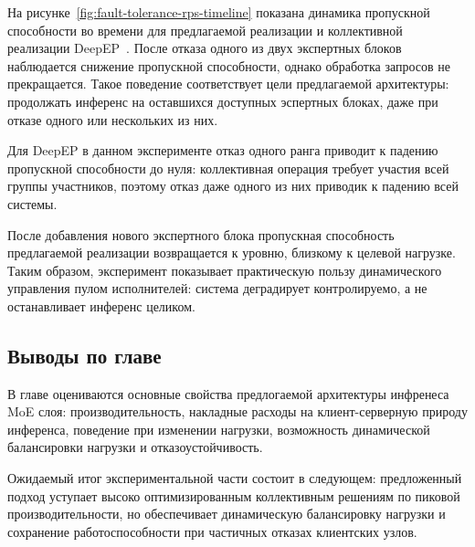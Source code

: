 На рисунке~\ref{fig:fault-tolerance-rps-timeline} показана динамика пропускной способности во времени для предлагаемой реализации и коллективной реализации DeepEP~\cite{deepseekDeepEP}. После отказа одного из двух экспертных блоков наблюдается снижение пропускной способности, однако обработка запросов не прекращается. Такое поведение соответствует цели предлагаемой архитектуры: продолжать инференс на оставшихся доступных эспертных блоках, даже при отказе одного или нескольких из них.

Для DeepEP в данном эксперименте отказ одного ранга приводит к падению пропускной способности до нуля: коллективная операция требует участия всей группы участников, поэтому отказ даже одного из них приводик к падению всей системы.

После добавления нового экспертного блока пропускная способность предлагаемой реализации возвращается к уровню, близкому к целевой нагрузке. Таким образом, эксперимент показывает практическую пользу динамического управления пулом исполнителей: система деградирует контролируемо, а не останавливает инференс целиком.

\subsection*{Выводы по главе}

В главе оцениваются основные свойства предлогаемой архитектуры инфренеса MoE слоя: производительность, накладные расходы на клиент-серверную природу инференса, поведение при изменении нагрузки, возможность динамической балансировки нагрузки и отказоустойчивость.

Ожидаемый итог экспериментальной части состоит в следующем: предложенный подход уступает высоко оптимизированным коллективным решениям по пиковой производительности, но обеспечивает динамическую балансировку нагрузки и сохранение работоспособности при частичных отказах клиентских узлов.
